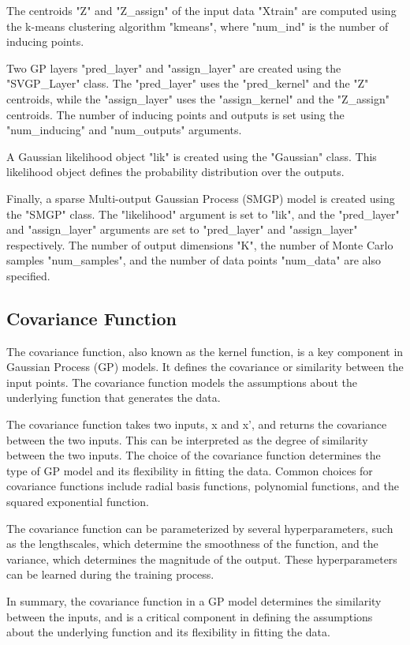 \documentclass[12pt,a4paper]{report}
\begin{document}
The centroids "Z" and "Z\_assign" of the input data "Xtrain" are computed using the k-means clustering algorithm "kmeans", where "num\_ind" is the number of inducing points.

Two GP layers "pred\_layer" and "assign\_layer" are created using the "SVGP\_Layer" class. 
The "pred\_layer" uses the "pred\_kernel" and the "Z" centroids, while the "assign\_layer" uses the "assign\_kernel" and the "Z\_assign" centroids. 
The number of inducing points and outputs is set using the "num\_inducing" and "num\_outputs" arguments.

A Gaussian likelihood object "lik" is created using the "Gaussian" class. 
This likelihood object defines the probability distribution over the outputs.

Finally, a sparse Multi-output Gaussian Process (SMGP) model is created using the "SMGP" class.
The "likelihood" argument is set to "lik", and the "pred\_layer" and "assign\_layer" arguments are set to "pred\_layer" and "assign\_layer" respectively. 
The number of output dimensions "K", the number of Monte Carlo samples "num\_samples", and the number of data points "num\_data" are also specified.

\subsection{Covariance Function}

The covariance function, also known as the kernel function, is a key component in Gaussian Process (GP) models. 
It defines the covariance or similarity between the input points. 
The covariance function models the assumptions about the underlying function that generates the data.

The covariance function takes two inputs, x and x', and returns the covariance between the two inputs. 
This can be interpreted as the degree of similarity between the two inputs. 
The choice of the covariance function determines the type of GP model and its flexibility in fitting the data. 
Common choices for covariance functions include radial basis functions, polynomial functions, and the squared exponential function.

The covariance function can be parameterized by several hyperparameters, such as the lengthscales, which determine the smoothness of the function, and the variance, which determines the magnitude of the output. 
These hyperparameters can be learned during the training process.

In summary, the covariance function in a GP model determines the similarity between the inputs, and is a critical component in defining the assumptions about the underlying function and its flexibility in fitting the data.
\end{document}
